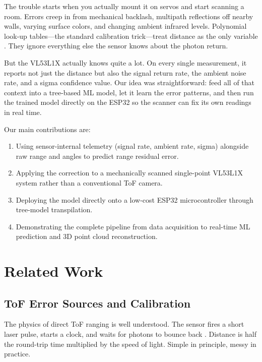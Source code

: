 \documentclass[conference, a4paper]{IEEEtran}
\begin{document}
The trouble starts when you actually mount it on servos and start scanning a room. Errors creep in from mechanical backlash, multipath reflections off nearby walls, varying surface colors, and changing ambient infrared levels. Polynomial look-up tables---the standard calibration trick---treat distance as the only variable \cite{lindner2010time}. They ignore everything else the sensor knows about the photon return.

But the VL53L1X actually knows quite a lot. On every single measurement, it reports not just the distance but also the signal return rate, the ambient noise rate, and a sigma confidence value. Our idea was straightforward: feed all of that context into a tree-based ML model, let it learn the error patterns, and then run the trained model directly on the ESP32 so the scanner can fix its own readings in real time.

Our main contributions are:
\begin{enumerate}
\item Using sensor-internal telemetry (signal rate, ambient rate, sigma) alongside raw range and angles to predict range residual error.
\item Applying the correction to a mechanically scanned single-point VL53L1X system rather than a conventional ToF camera.
\item Deploying the model directly onto a low-cost ESP32 microcontroller through tree-model transpilation.
\item Demonstrating the complete pipeline from data acquisition to real-time ML prediction and 3D point cloud reconstruction.
\end{enumerate}

\section{Related Work}

\subsection{ToF Error Sources and Calibration}
The physics of direct ToF ranging is well understood. The sensor fires a short laser pulse, starts a clock, and waits for photons to bounce back \cite{foix2011lock, hansard2012time}. Distance is half the round-trip time multiplied by the speed of light. Simple in principle, messy in practice.
\end{document}
